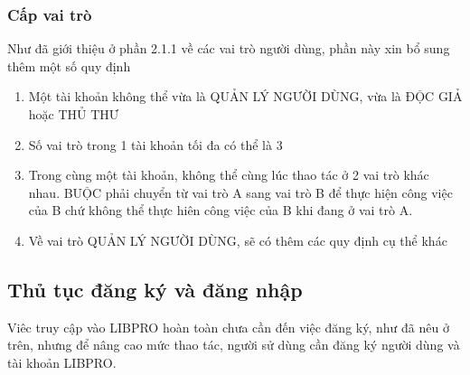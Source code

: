 \documentclass[12pt,a4paper]{report}
\begin{document}
			\subsubsection{Cấp vai trò}
			Như đã giới thiệu ở phần 2.1.1 về các vai trò người dùng, phần này xin bổ sung thêm một số quy định
			\begin{enumerate}
				\item Một tài khoản không thể vừa là QUẢN LÝ NGƯỜI DÙNG, vừa là ĐỘC GIẢ hoặc THỦ THƯ
				\item Số vai trò trong 1 tài khoản tối đa có thể là 3
				\item Trong cùng một tài khoản, không thể cùng lúc thao tác ở 2 vai trò khác nhau. BUỘC phải chuyển từ vai trò A sang vai trò B để thực hiện công việc của B chứ không thể thực hiên công việc của B khi đang ở vai trò A.
				\item Về vai trò QUẢN LÝ NGƯỜI DÙNG, sẽ có thêm các quy định cụ thể khác
			\end{enumerate}
		\subsection{Thủ tục đăng ký và đăng nhập}
		Viêc truy cập vào LIBPRO hoàn toàn chưa cần đến việc đăng ký, như đã nêu ở trên, nhưng để nâng cao mức thao tác, người sử dùng cần đăng ký người dùng và tài khoản LIBPRO.\\
\end{document}
